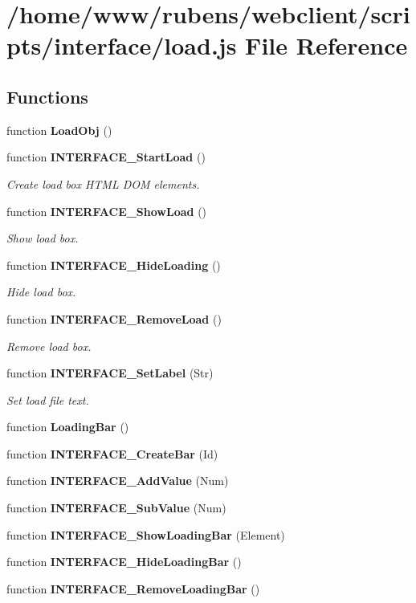 \section{/home/www/rubens/webclient/scripts/interface/load.js File Reference}
\label{interface_2load_8js}
\subsection*{Functions}
\begin{CompactItemize}
\item 
function {\bf LoadObj} ()
\item 
function {\bf INTERFACE\_\-StartLoad} ()
\begin{CompactList}\small\item\em Create load box HTML DOM elements. \item\end{CompactList}\item 
function {\bf INTERFACE\_\-ShowLoad} ()
\begin{CompactList}\small\item\em Show load box. \item\end{CompactList}\item 
function {\bf INTERFACE\_\-HideLoading} ()
\begin{CompactList}\small\item\em Hide load box. \item\end{CompactList}\item 
function {\bf INTERFACE\_\-RemoveLoad} ()
\begin{CompactList}\small\item\em Remove load box. \item\end{CompactList}\item 
function {\bf INTERFACE\_\-SetLabel} (Str)
\begin{CompactList}\small\item\em Set load file text. \item\end{CompactList}\item 
function {\bf LoadingBar} ()
\item 
function {\bf INTERFACE\_\-CreateBar} (Id)
\item 
function {\bf INTERFACE\_\-AddValue} (Num)
\item 
function {\bf INTERFACE\_\-SubValue} (Num)
\item 
function {\bf INTERFACE\_\-ShowLoadingBar} (Element)
\item 
function {\bf INTERFACE\_\-HideLoadingBar} ()
\item 
function {\bf INTERFACE\_\-RemoveLoadingBar} ()
\end{CompactItemize}


